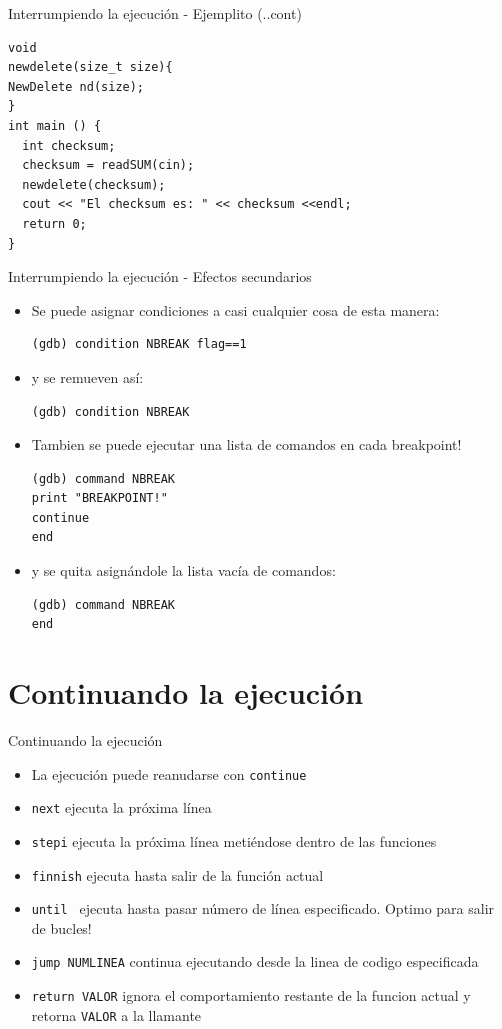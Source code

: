 \documentclass[xetex]{beamer}
\begin{document}
\begin{frame}[fragile]{Interrumpiendo la ejecución - Ejemplito (..cont)}
\begin{lstlisting}
void
newdelete(size_t size){
NewDelete nd(size);
}
int main () {
  int checksum;
  checksum = readSUM(cin);
  newdelete(checksum);
  cout << "El checksum es: " << checksum <<endl;
  return 0;
}
\end{lstlisting}
\end{frame}


\begin{frame}[fragile]{Interrumpiendo la ejecución - Efectos secundarios}
\begin{itemize}

\item Se puede asignar condiciones a casi cualquier cosa de esta manera:
\begin{verbatim}
(gdb) condition NBREAK flag==1
\end{verbatim}

\item y se remueven así:
\begin{verbatim}
(gdb) condition NBREAK
\end{verbatim}

\item Tambien se puede ejecutar una lista de comandos en cada breakpoint!
\begin{verbatim}
(gdb) command NBREAK
print "BREAKPOINT!"
continue
end
\end{verbatim}

\item y se quita asignándole la lista vacía de comandos:
\begin{verbatim}
(gdb) command NBREAK
end
\end{verbatim}

\end{itemize}
\end{frame}
\section{Continuando la ejecución}
\begin{frame}[fragile]{Continuando la ejecución}
\begin{itemize}
\item La ejecución puede reanudarse con \verb=continue=
\item \verb=next= ejecuta la próxima línea
\item \verb=stepi= ejecuta la próxima línea metiéndose dentro de las funciones
\item \verb=finnish= ejecuta hasta salir de la función actual
\item \verb=until = ejecuta hasta pasar número de línea especificado. Optimo para salir de bucles!
\item \verb=jump NUMLINEA= continua ejecutando desde la linea de codigo especificada
\item \verb=return VALOR= ignora el comportamiento restante de la funcion actual y retorna \verb=VALOR= a la llamante
\end{itemize}
\end{frame}
\end{document}
